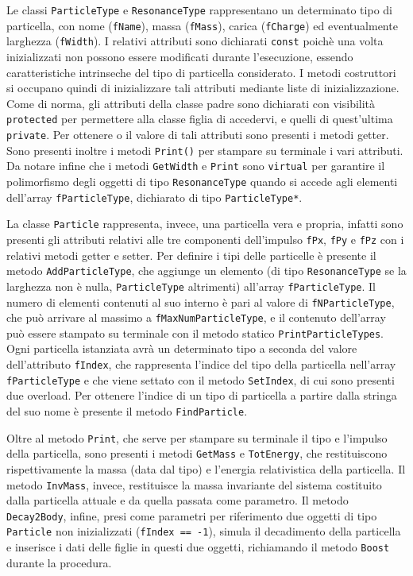 \documentclass{article}
\begin{document}
Le classi \texttt{ParticleType} e \texttt{ResonanceType} rappresentano un determinato tipo di particella, con nome (\texttt{fName}), massa (\texttt{fMass}), carica (\texttt{fCharge}) ed eventualmente larghezza (\texttt{fWidth}). I relativi attributi sono dichiarati \texttt{const} poichè una volta inizializzati non possono essere modificati durante l'esecuzione, essendo caratteristiche intrinseche del tipo di particella considerato. I metodi costruttori si occupano quindi di inizializzare tali attributi mediante liste di inizializzazione. Come di norma, gli attributi della classe padre sono dichiarati con visibilità \texttt{protected} per permettere alla classe figlia di accedervi, e quelli di quest'ultima \texttt{private}. Per ottenere o il valore di tali attributi
sono presenti i metodi getter. Sono presenti inoltre i metodi \texttt{Print()} per stampare su terminale i vari attributi. Da notare infine che i metodi \texttt{GetWidth} e \texttt{Print} sono \texttt{virtual} per garantire il polimorfismo degli oggetti di tipo \texttt{ResonanceType} quando si accede agli elementi dell'array \texttt{fParticleType}, dichiarato di tipo \texttt{ParticleType*}.

La classe \texttt{Particle} rappresenta, invece, una particella vera e propria, infatti sono presenti gli attributi relativi alle tre componenti dell'impulso \texttt{fPx}, \texttt{fPy} e \texttt{fPz} con i relativi metodi getter e setter. Per definire i tipi delle particelle è presente il metodo \texttt{AddParticleType}, che aggiunge un elemento (di tipo \texttt{ResonanceType} se la larghezza non è nulla, \texttt{ParticleType} altrimenti) all'array \texttt{fParticleType}. Il numero di elementi contenuti al suo interno è pari al valore di \texttt{fNParticleType}, che può arrivare al massimo a \texttt{fMaxNumParticleType}, e il contenuto dell'array può essere stampato su terminale con il metodo statico \texttt{PrintParticleTypes}. Ogni particella istanziata avrà un determinato tipo a seconda del valore dell'attributo \texttt{fIndex}, che rappresenta l'indice del tipo della particella nell'array \texttt{fParticleType} e che viene settato con il metodo \texttt{SetIndex}, di cui sono presenti due overload. Per ottenere l'indice di un tipo di particella a partire dalla stringa del suo nome è presente il metodo \texttt{FindParticle}.

Oltre al metodo \texttt{Print}, che serve per stampare su terminale il tipo e l'impulso della particella, sono presenti i metodi \texttt{GetMass} e \texttt{TotEnergy}, che restituiscono rispettivamente la massa (data dal tipo) e l'energia relativistica della particella. Il metodo \texttt{InvMass}, invece, restituisce la massa invariante del sistema costituito dalla particella attuale e da quella passata come parametro. Il metodo \texttt{Decay2Body}, infine, presi come parametri per riferimento due oggetti di tipo \texttt{Particle} non inizializzati (\texttt{fIndex == -1}), simula il decadimento della particella e inserisce i dati delle figlie in questi due oggetti, richiamando il metodo \texttt{Boost} durante la procedura.
\end{document}

